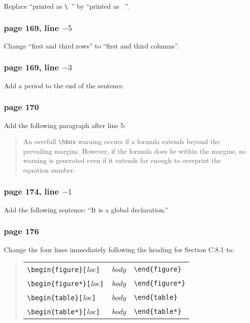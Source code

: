 Replace ``printed as \verb*|\ |'' by ``printed as \verb*| |''.
 
\subsubsection*{page 169, line $-5$}
Change ``first and third rows'' to ``first and third columns''.
 
\subsubsection*{page 169, line $-3$}
Add a period to the end of the sentence.
 
\subsubsection*{page 170}
 
Add the following paragraph after line 5:
\begin{quote}
An overfull \verb|\hbox| warning occurs if a formula extends beyond the
prevailing margins.  However, if the formula does lie within the
margins, no warning is generated even if it extends far enough to
overprint the equation number.
\end{quote}
 
\subsubsection*{page 174, line $-1$}
Add the following sentence: ``It is a global declaration.''
 
\subsubsection*{page 176}
 
Change the four lines immediately following the heading for
Section C.8.1 to:
\begin{quote}
\begin{tabular}{lll}
 \verb|\begin{figure}[|{\em loc\/}{\tt ]} & {\em body\/}
      & \verb|\end{figure}| \\
 \verb|\begin{figure*}[|{\em loc\/}{\tt ]} & {\em body\/}
      & \verb|\end{figure*}| \\
 \verb|\begin{table}[|{\em loc\/}{\tt ]} & {\em body\/}
      & \verb|\end{table}| \\
 \verb|\begin{table*}[|{\em loc\/}{\tt ]} & {\em body\/}
      & \verb|\end{table*}| 
\end{tabular}
\end{quote}
 
